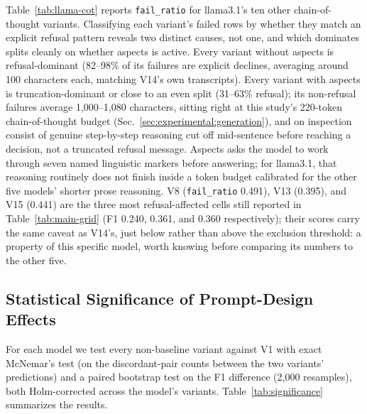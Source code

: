 Table~\ref{tab:llama-cot} reports \texttt{fail\_ratio} for llama3.1's
ten other chain-of-thought variants. Classifying each variant's failed
rows by whether they match an explicit refusal pattern reveals two
distinct causes, not one, and which dominates splits cleanly on whether
aspects is active. Every variant without aspects is refusal-dominant
(82--98\% of its failures are explicit declines, averaging around 100
characters each, matching V14's own transcripts). Every variant with
aspects is truncation-dominant or close to an even split (31--63\%
refusal); its non-refusal failures average 1{,}000--1{,}080 characters,
sitting right at this study's 220-token chain-of-thought budget
(Sec.~\ref{sec:experimental:generation}), and on inspection consist of
genuine step-by-step reasoning cut off mid-sentence before reaching a
decision, not a truncated refusal message. Aspects asks the model to
work through seven named linguistic markers before answering; for
llama3.1, that reasoning routinely does not finish inside a token budget
calibrated for the other five models' shorter prose reasoning. V8
(\texttt{fail\_ratio} 0.491), V13 (0.395), and V15 (0.441) are the three
most refusal-affected cells still reported in Table~\ref{tab:main-grid}
(F1 0.240, 0.361, and 0.360 respectively); their scores carry the same
caveat as V14's, just below rather than above the exclusion threshold: a
property of this specific model, worth knowing before comparing its
numbers to the other five.

\subsection{Statistical Significance of Prompt-Design Effects}
\label{sec:results:significance}

For each model we test every non-baseline variant against V1 with
exact McNemar's test (on the discordant-pair counts between the two
variants' predictions) and a paired bootstrap test on the F1 difference
(2{,}000 resamples), both Holm-corrected across the model's variants.
Table~\ref{tab:significance} summarizes the results.

